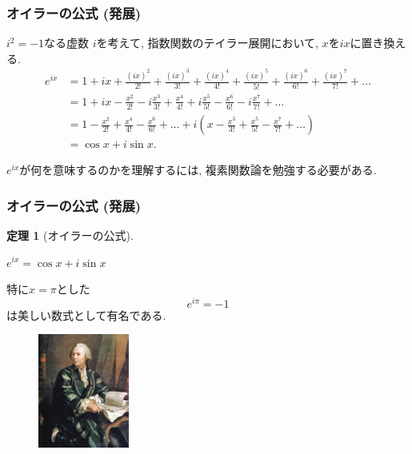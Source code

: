 \documentclass[dvipdfmx,cjk,10.2pt]{beamer}
\theoremstyle{definition}
\newtheorem{Thm}{定理}[section]
\begin{document}

\begin{frame}
\frametitle{オイラーの公式 (発展)}

$i^2=-1$なる虚数 $i$を考えて, 指数関数のテイラー展開において, $x$を$ix$に置き換える. 
\begin{align*}
e^{ix} & = 1+ix+\frac{(ix)^2}{2!}+\frac{(ix)^3}{3!}+\frac{(ix)^4}{4!}+\frac{(ix)^5}{5!}+\frac{(ix)^6}{6!}+\frac{(ix)^7}{7!}+\dots \\
& = 1+ix-\frac{x^2}{2!}-i\frac{x^3}{3!}+\frac{x^4}{4!}+i\frac{x^5}{5!}-\frac{x^6}{6!}-i\frac{x^7}{7!}+\dots \\
& = 1  -\frac{x^2}{2!}  +\frac{x^4}{4!}  -\frac{x^6}{6!} +\dots + i(x  -\frac{x^3}{3!}  +\frac{x^5}{5!} -\frac{x^7}{7!} + \dots ) \\
& = \cos x + i \sin x. 
\end{align*}

$e^{ix}$が何を意味するのかを理解するには, 複素関数論を勉強する必要がある. 

\end{frame}





\begin{frame}
\frametitle{オイラーの公式 (発展)}

\begin{Thm}[オイラーの公式]
\begin{center}
$
e^{ix} = \cos x + i \sin x
$
\end{center}
\end{Thm}

特に$x=\pi$とした
$$
e^{i \pi }=-1
$$
は美しい数式として有名である. 


 \begin{figure}[htbp]
 \begin{center} 
  \includegraphics[width=30mm, bb=0 0 614 767]{Euler.jpg}
 \end{center}
\end{figure}

\end{frame}
\end{document}
